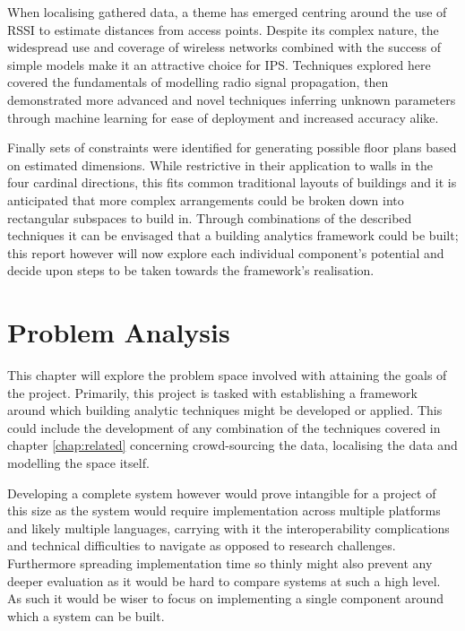 \documentclass{UoYCSproject}
\begin{document}
            When localising gathered data, a theme has emerged centring around the use of RSSI to estimate distances from access points. Despite its complex nature, the  widespread use and coverage of wireless networks combined with the success of simple models make it an attractive choice for IPS. Techniques explored here covered the fundamentals of modelling radio signal propagation, then demonstrated more advanced and novel techniques inferring unknown parameters through machine learning for ease of deployment and increased accuracy alike.
            
            Finally sets of constraints were identified for generating possible floor plans based on estimated dimensions. While restrictive in their application to walls in the four cardinal directions, this fits common traditional layouts of buildings and it is anticipated that more complex arrangements could be broken down into rectangular subspaces to build in. Through combinations of the described techniques it can be envisaged that a building analytics framework could be built; this report however will now explore each individual component's potential and decide upon steps to be taken towards the framework's realisation.

    \chapter{Problem Analysis}
    \label{chap:problem}
    
        This chapter will explore the problem space involved with attaining the goals of the project. Primarily, this project is tasked with establishing a framework around which building analytic techniques might be developed or applied. This could include the development of any combination of the techniques covered in chapter \ref{chap:related} concerning crowd-sourcing the data, localising the data and modelling the space itself.
        
        Developing a complete system however would prove intangible for a project of this size as the system would require implementation across multiple platforms and likely multiple languages, carrying with it the interoperability complications and technical difficulties to navigate as opposed to research challenges. Furthermore spreading implementation time so thinly might also prevent any deeper evaluation as it would be hard to compare systems at such a high level. As such it would be wiser to focus on implementing a single component around which a system can be built.
        
\end{document}
